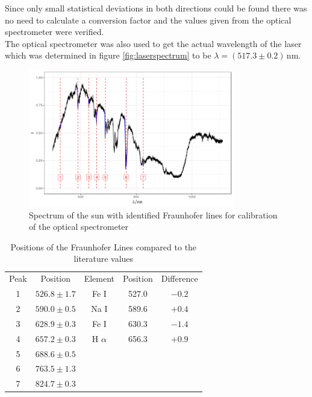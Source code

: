 Since only small statistical deviations in both directions could be found there was no need to calculate a conversion factor and the values given from the optical spectrometer were verified. \\

The optical spectrometer was also used to get the actual wavelength of the laser which was determined in figure \ref{fig:laserspectrum} to be $\lambda=(517.3\pm0.2)\,\mathrm{nm}$.
\begin{figure}
	\centering
	\includegraphics[width=0.8\textwidth]{../figures/sunspectrum.png}
	\caption[Spectrum of the sun with identified Fraunhofer lines]{Spectrum of the sun with identified Fraunhofer lines for calibration of the optical spectrometer}
	\label{fig:sunspectrum}
\end{figure}

\begin{table}
	\centering
	\begin{tabular}{c|c|c|c|c}
		Peak&Position&Element&Position \cite{fraunhoferlines}&Difference\\
		1&$526.8\pm1.7$&Fe I&527.0&$-0.2$\\
		2&$590.0\pm0.5$&Na I&589.6&$+0.4$\\
		3&$628.9\pm0.3$&Fe I&630.3&$-1.4$\\
		4&$657.2\pm0.3$&H $\alpha$&656.3&$+0.9$\\
		5&$688.6\pm0.5$&&&\\
		6&$763.5\pm1.3$&&&\\
		7&$824.7\pm0.3$&&&\\
	\end{tabular}
	\caption{Positions of the Fraunhofer Lines compared to the literature values}
	\label{tab:fraunhofer}
\end{table}

